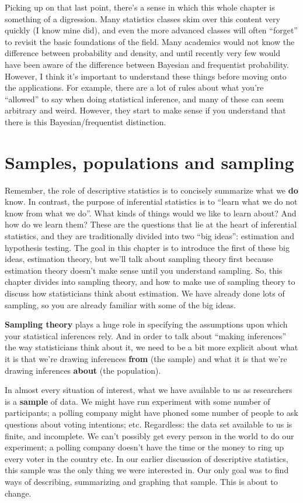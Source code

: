 \documentclass[
  letterpaper,
  DIV=11,
  numbers=noendperiod]{scrreprt}
\begin{document}
Picking up on that last point, there's a sense in which this whole
chapter is something of a digression. Many statistics classes skim over
this content very quickly (I know mine did), and even the more advanced
classes will often ``forget'' to revisit the basic foundations of the
field. Many academics would not know the difference between probability
and density, and until recently very few would have been aware of the
difference between Bayesian and frequentist probability. However, I
think it's important to understand these things before moving onto the
applications. For example, there are a lot of rules about what you're
``allowed'' to say when doing statistical inference, and many of these
can seem arbitrary and weird. However, they start to make sense if you
understand that there is this Bayesian/frequentist distinction.

\section{Samples, populations and
sampling}\label{samples-populations-and-sampling}

Remember, the role of descriptive statistics is to concisely summarize
what we \textbf{do} know. In contrast, the purpose of inferential
statistics is to ``learn what we do not know from what we do''. What
kinds of things would we like to learn about? And how do we learn them?
These are the questions that lie at the heart of inferential statistics,
and they are traditionally divided into two ``big ideas'': estimation
and hypothesis testing. The goal in this chapter is to introduce the
first of these big ideas, estimation theory, but we'll talk about
sampling theory first because estimation theory doesn't make sense until
you understand sampling. So, this chapter divides into sampling theory,
and how to make use of sampling theory to discuss how statisticians
think about estimation. We have already done lots of sampling, so you
are already familiar with some of the big ideas.

\textbf{Sampling theory} plays a huge role in specifying the assumptions
upon which your statistical inferences rely. And in order to talk about
``making inferences'' the way statisticians think about it, we need to
be a bit more explicit about what it is that we're drawing inferences
\textbf{from} (the sample) and what it is that we're drawing inferences
\textbf{about} (the population).

In almost every situation of interest, what we have available to us as
researchers is a \textbf{sample} of data. We might have run experiment
with some number of participants; a polling company might have phoned
some number of people to ask questions about voting intentions; etc.
Regardless: the data set available to us is finite, and incomplete. We
can't possibly get every person in the world to do our experiment; a
polling company doesn't have the time or the money to ring up every
voter in the country etc. In our earlier discussion of descriptive
statistics, this sample was the only thing we were interested in. Our
only goal was to find ways of describing, summarizing and graphing that
sample. This is about to change.
\end{document}
